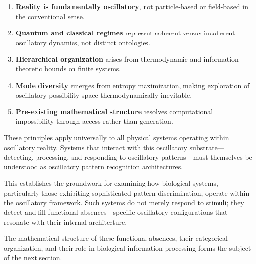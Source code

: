 \documentclass[11pt]{article}
\theoremstyle{remark}
\begin{document}
\begin{enumerate}
\item \textbf{Reality is fundamentally oscillatory}, not particle-based or field-based in the conventional sense.

\item \textbf{Quantum and classical regimes} represent coherent versus incoherent oscillatory dynamics, not distinct ontologies.

\item \textbf{Hierarchical organization} arises from thermodynamic and information-theoretic bounds on finite systems.

\item \textbf{Mode diversity} emerges from entropy maximization, making exploration of oscillatory possibility space thermodynamically inevitable.

\item \textbf{Pre-existing mathematical structure} resolves computational impossibility through access rather than generation.
\end{enumerate}

These principles apply universally to all physical systems operating within oscillatory reality. Systems that interact with this oscillatory substrate—detecting, processing, and responding to oscillatory patterns—must themselves be understood as oscillatory pattern recognition architectures.

This establishes the groundwork for examining how biological systems, particularly those exhibiting sophisticated pattern discrimination, operate within the oscillatory framework. Such systems do not merely respond to stimuli; they detect and fill functional absences—specific oscillatory configurations that resonate with their internal architecture.

The mathematical structure of these functional absences, their categorical organization, and their role in biological information processing forms the subject of the next section.
\end{document}
